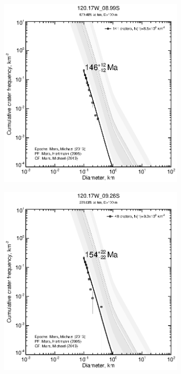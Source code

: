 \documentclass[12pt,letter]{article}
\begin{document}
\begin{figure}[h]
\begin{subfigure}{.33\textwidth}
\end{subfigure}%
\begin{subfigure}{.33\textwidth}
  \includegraphics[width=\linewidth,clip,trim=1cm 1cm 1.5cm 1cm]{figures/craterstats/120-17W_08-99S_100m_cum.eps}
\end{subfigure}
\begin{subfigure}{.33\textwidth}
  \includegraphics[width=\linewidth,clip,trim=1cm 1cm 1.5cm 1cm]{figures/craterstats/120-17W_09-26S_100m_cum.eps}
\end{subfigure}
\end{figure}
\end{document}
